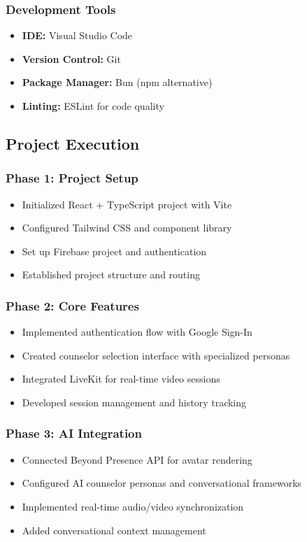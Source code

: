 \documentclass[11pt,a4paper]{article}
\begin{document}
\subsubsection{Development Tools}
\begin{itemize}
    \item \textbf{IDE:} Visual Studio Code
    \item \textbf{Version Control:} Git
    \item \textbf{Package Manager:} Bun (npm alternative)
    \item \textbf{Linting:} ESLint for code quality
\end{itemize}

\subsection{Project Execution}

\subsubsection{Phase 1: Project Setup}
\begin{itemize}
    \item Initialized React + TypeScript project with Vite
    \item Configured Tailwind CSS and component library
    \item Set up Firebase project and authentication
    \item Established project structure and routing
\end{itemize}

\subsubsection{Phase 2: Core Features}
\begin{itemize}
    \item Implemented authentication flow with Google Sign-In
    \item Created counselor selection interface with specialized personas
    \item Integrated LiveKit for real-time video sessions
    \item Developed session management and history tracking
\end{itemize}

\subsubsection{Phase 3: AI Integration}
\begin{itemize}
    \item Connected Beyond Presence API for avatar rendering
    \item Configured AI counselor personas and conversational frameworks
    \item Implemented real-time audio/video synchronization
    \item Added conversational context management
\end{itemize}
\end{document}
